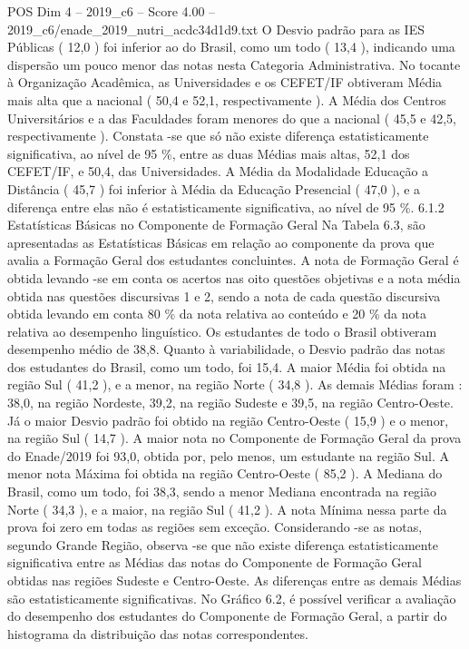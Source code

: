 \begin{textsample}{POS Dim 4 – 2019\_c6 – Score 4.00 – 2019\_c6/enade\_2019\_nutri\_acdc34d1d9.txt}
O Desvio padrão para as IES Públicas ( 12,0 ) foi inferior ao do Brasil, como um todo ( 13,4 ), indicando uma dispersão um pouco menor das notas nesta Categoria Administrativa.
No tocante à Organização Acadêmica, as Universidades e os CEFET/IF obtiveram Média mais alta que a nacional ( 50,4 e 52,1, respectivamente ).
A Média dos Centros Universitários e a das Faculdades foram menores do que a nacional ( 45,5 e 42,5, respectivamente ).
Constata -se que só não existe diferença estatisticamente significativa, ao nível de 95 \%, entre as duas Médias mais altas, 52,1 dos CEFET/IF, e 50,4, das Universidades.
A Média da Modalidade Educação a Distância ( 45,7 ) foi inferior à Média da Educação Presencial ( 47,0 ), e a diferença entre elas não é estatisticamente significativa, ao nível de 95 \%. 6.1.2 Estatísticas Básicas no Componente de Formação Geral Na Tabela 6.3, são apresentadas as Estatísticas Básicas em relação ao componente da prova que avalia a Formação Geral dos estudantes concluintes.
A nota de Formação Geral é obtida levando -se em conta os acertos nas oito questões objetivas e a nota média obtida nas questões discursivas 1 e 2, sendo a nota de cada questão discursiva obtida levando em conta 80 \% da nota relativa ao conteúdo e 20 \% da nota relativa ao desempenho linguístico.
Os estudantes de todo o Brasil obtiveram desempenho médio de 38,8.
Quanto à variabilidade, o Desvio padrão das notas dos estudantes do Brasil, como um todo, foi 15,4.
A maior Média foi obtida na região Sul ( 41,2 ), e a menor, na região Norte ( 34,8 ).
As demais Médias foram : 38,0, na região Nordeste, 39,2, na região Sudeste e 39,5, na região Centro-Oeste.
Já o maior Desvio padrão foi obtido na região Centro-Oeste ( 15,9 ) e o menor, na região Sul ( 14,7 ).
A maior nota no Componente de Formação Geral da prova do Enade/2019 foi 93,0, obtida por, pelo menos, um estudante na região Sul.
A menor nota Máxima foi obtida na região Centro-Oeste ( 85,2 ).
A Mediana do Brasil, como um todo, foi 38,3, sendo a menor Mediana encontrada na região Norte ( 34,3 ), e a maior, na região Sul ( 41,2 ).
A nota Mínima nessa parte da prova foi zero em todas as regiões sem exceção.
Considerando -se as notas, segundo Grande Região, observa -se que não existe diferença estatisticamente significativa entre as Médias das notas do Componente de Formação Geral obtidas nas regiões Sudeste e Centro-Oeste.
As diferenças entre as demais Médias são estatisticamente significativas.
No Gráfico 6.2, é possível verificar a avaliação do desempenho dos estudantes do Componente de Formação Geral, a partir do histograma da distribuição das notas correspondentes.

\end{textsample}
